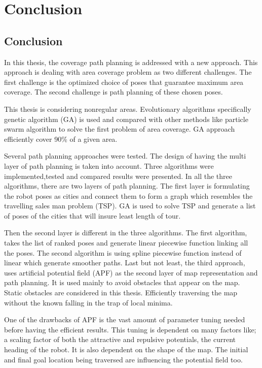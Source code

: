 \chapter{Conclusion} \label{chap:conc}

\section{Conclusion}
In this thesis, the coverage path planning is addressed with a new approach. This approach is dealing with area coverage problem as two different challenges. The first challenge is the optimized choice of poses that guarantee maximum area coverage. The second challenge is path planning of these chosen poses.

This thesis is considering nonregular areas. Evolutionary algorithms specifically genetic algorithm (GA) is used  and compared with other methods like particle swarm algorithm to solve the first problem of area coverage. GA approach efficiently cover 90\% of a given area. 

Several path planning approaches were tested. The design of having the multi layer of path planning is taken into account. Three algorithms were implemented,tested and compared results were presented. In all the three algorithms, there are two layers of path planning.  The first layer is formulating the robot poses as cities and connect them to form a graph which resembles the travelling sales man problem (TSP). GA is used to solve TSP and generate a list of poses of the cities that will insure least length of tour.

Then the second layer is different in the three algorithms. The first algorithm, takes the list of ranked poses and generate linear piecewise function linking all the poses. The second algorithm is using spline piecewise function instead of linear which generate smoother paths. Last but not least, the third approach, uses artificial potential field (APF) as the second layer of map representation and path planning. It is used mainly to avoid obstacles that appear on the map. Static obstacles are considered in this thesis. Efficiently traversing the map without the known falling in the trap of local minima.

One of the drawbacks of APF is the vast amount of parameter tuning needed before having the efficient results. This tuning is dependent on many factors like; a scaling factor of both the attractive and repulsive potentials, the current heading of the robot. It is also dependent on the shape of the map. The initial and final goal location being traversed are influencing the potential field too.

